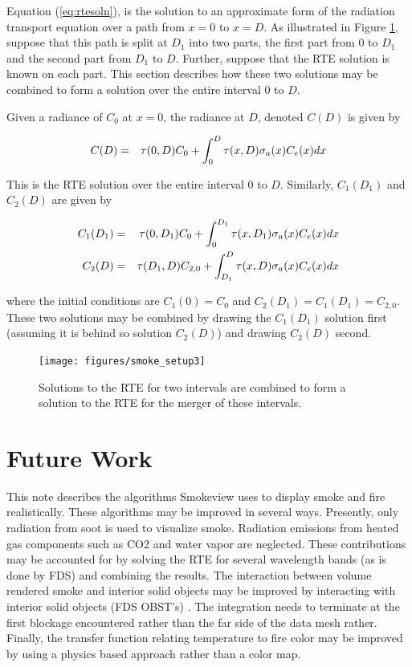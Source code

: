 Equation (\ref{eq:rtesoln}), is the solution to an approximate form of the radiation transport equation over a path from $x=0$ to $x=D$.  As illustrated in Figure \ref{figsmokesetup3}, suppose that this path is split at $D_1$ into two parts, the first part from $0$ to $D_1$ and the second part from $D_1$ to $D$. Further, suppose that the RTE solution is known on each part. This section describes how these two solutions may be combined to form a solution over the entire interval $0$ to $D$.

Given a radiance of $C_0$ at $x=0$, the radiance at $D$, denoted $C(D)$ is given by

\begin{eqnarray}
\label{eq:rtesoln2}
C(D)&=&\tau(0,D)C_0 + \int_0^D\tau(x,D)\sigma_a(x)C_e(x) dx
\end{eqnarray}

This is the RTE solution over the entire interval $0$ to $D$. Similarly, $C_1(D_1)$ and $C_2(D)$ are given by

\begin{eqnarray*}
C_1(D_1)&=&\tau(0,D_1)C_0 + \int_0^{D_1}\tau(x,D_1)\sigma_a(x)C_e(x) dx\\
C_2(D)&=&\tau(D_1,D)C_{2,0} + \int_{D_1}^{D}\tau(x,D)\sigma_a(x)C_e(x) dx
\end{eqnarray*}

where the initial conditions are $C_1(0)=C_0$ and $C_2(D_1)=C_1(D_1)=C_{2,0}$.  These two solutions may be combined by drawing the $C_1(D_1)$ solution first (assuming it is behind so solution $C_2(D)$) and drawing $C_2(D)$ second.


\begin{figure}[\figoptions]
\begin{center}
\texttt{[image: figures/smoke\_setup3]}
\end{center}
\caption {Solutions to the RTE for two intervals are combined to form a solution to the RTE
for the merger of these intervals.
}
\label{figsmokesetup3}
\end{figure}

\section{Future Work}
This note describes the algorithms Smokeview uses to display smoke and fire realistically.  These algorithms may be improved in several ways.  Presently, only radiation from soot is used to visualize smoke.  Radiation emissions from heated gas components such as CO2 and water vapor are neglected.  These contributions may be accounted for by solving the RTE for several wavelength bands (as is done by FDS) and combining the results.  The interaction between volume rendered smoke and interior solid objects may be improved by interacting with interior solid objects (FDS OBST's) .  The integration needs to terminate at the first blockage encountered rather than the far side of the data mesh rather.  Finally, the transfer function relating temperature to fire color may be improved by using a physics based approach rather than a color map.



